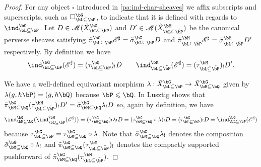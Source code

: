 \documentclass[eqthmnum,nocolour,skinny]{jt-calcs}
\begin{document}
\begin{proof}
For any object $\square$ introduced in \cref{pa:ind-char-sheaves} we affix subscripts and superscripts, such as $\square_{\bL\subseteq\bP}^{\bG}$, to indicate that it is defined with regards to $\ind_{\bL \subseteq \bP}^{\bG}$. Let $D \in \mathscr{M}(\tilde{X}_{\bL \subseteq \bP}^{\bG})$ and $D' \in \mathscr{M}(\tilde{X}_{\bL \subseteq \tilde{\bP}}^{\bM})$ be the canonical perverse sheaves satisfying $\tilde{\pi}_{\bL \subseteq \bP}^{\bG}\mathscr{E}^{\sharp} = \tilde{\sigma}_{\bL \subseteq \bP}^{\bG}D$ and $\tilde{\pi}_{\bL \subseteq \tilde{\bP}}^{\bM}\mathscr{E}^{\sharp} = \tilde{\sigma}_{\bL \subseteq \tilde{\bP}}^{\bM}D'$ respectively. By definition we have
\begin{equation*}
\ind_{\bL \subseteq \bP}^{\bG}(\mathscr{E}^{\sharp}) = (\tau_{\bL \subseteq \bP}^{\bG})_!D \qquad \ind_{\bL \subseteq \tilde{\bP}}^{\bM}(\mathscr{E}^{\sharp}) = (\tau_{\bL \subseteq \tilde{\bP}}^{\bM})_!D'.
\end{equation*}

We have a well-defined equivariant morphism $\lambda : \tilde{X}_{\bL \subseteq \bP}^{\bG} \to \tilde{X}_{\bM \subseteq \bQ}^{\bG}$ given by $\lambda(g,h\bP) = (g,h\bQ)$ because $\bP \leqslant \bQ$. In \cite[4.2(b)]{lusztig:1985:character-sheaves} Lusztig shows that $\tilde{\pi}_{\bM\subseteq\bQ}^{\bG}(\tau_{\bL\subseteq\tilde{\bP}}^{\bM})_!D' = \tilde{\sigma}_{\bM\subseteq\bQ}^{\bG}\lambda_!D$ so, again by definition, we have
\begin{equation*}
\ind_{\bM \subseteq \bQ}^{\bG}(\ind_{\bL \subseteq \tilde{\bP}}^{\bM}(\mathscr{E}^{\sharp})) = (\tau_{\bM\subseteq\bQ}^{\bG})_!\lambda_!D = (\tau_{\bM\subseteq\bQ}^{\bG}\circ \lambda)_!D = (\tau_{\bL\subseteq\bP}^{\bG})_!D = \ind_{\bL \subseteq \bP}^{\bG}(\mathscr{E}^{\sharp})
\end{equation*}
because $\tau_{\bL\subseteq\bP}^{\bG} = \tau_{\bM\subseteq\bQ}^{\bG}\circ \lambda$. Note that $\tilde{\sigma}_{\bM\subseteq\bQ}^{\bG}\lambda_!$ denotes the composition $\tilde{\sigma}_{\bM\subseteq\bQ}^{\bG} \circ \lambda_!$ and $\tilde{\pi}_{\bM\subseteq\bQ}^{\bG}(\tau_{\bL\subseteq\tilde{\bP}}^{\bM})_!$ denotes the compactly supported pushforward of $\tilde{\pi}_{\bM\subseteq\bQ}^{\bG}(\tau_{\bL\subseteq\tilde{\bP}}^{\bM})$.


\end{proof}
\end{document}
